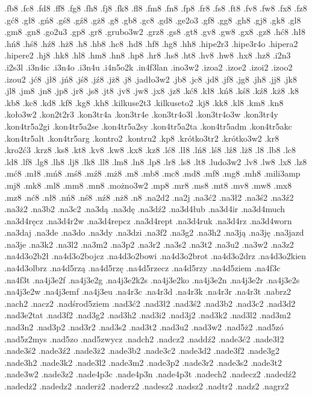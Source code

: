{.fb8
.fc8
.fd8
.ff8
.fg8
.fh8
.fj8
.fk8
.fl8
.fm8
.fn8
.fp8
.fr8
.fs8
.ft8
.fv8
.fw8
.fx8
.fz8
.gć8
.gł8
.gń8
.gś8
.gź8
.gż8
.g8
.gb8
.gc8
.gd8
.ge2o3
.gf8
.gg8
.gh8
.gj8
.gk8
.gl8
.gm8
.gn8
.go2u3
.gp8
.gr8
.grubo3w2
.grz8
.gs8
.gt8
.gv8
.gw8
.gx8
.gz8
.hć8
.hł8
.hń8
.hś8
.hź8
.hż8
.h8
.hb8
.hc8
.hd8
.hf8
.hg8
.hh8
.hipe2r3
.hipe3r4o
.hipera2
.hipere2
.hj8
.hk8
.hl8
.hm8
.hn8
.hp8
.hr8
.hs8
.ht8
.hv8
.hw8
.hx8
.hz8
.i2n3
.i2s3l
.i3n4ic
.i3n4o
.i3n4u
.i4n5o2k
.in4f3lan
.ino3w2
.izoa2
.izoe2
.izoi2
.izoo2
.izou2
.jć8
.jł8
.jń8
.jś8
.jź8
.jż8
.j8
.jadło3w2
.jb8
.jc8
.jd8
.jf8
.jg8
.jh8
.jj8
.jk8
.jl8
.jm8
.jn8
.jp8
.jr8
.js8
.jt8
.jv8
.jw8
.jx8
.jz8
.kć8
.kł8
.kń8
.kś8
.kź8
.kż8
.k8
.kb8
.kc8
.kd8
.kf8
.kg8
.kh8
.kilkuse2t3
.kilkuseto2
.kj8
.kk8
.kl8
.km8
.kn8
.koło3w2
.kon2t2r3
.kon3tr4a
.kon3tr4e
.kon3tr4o3l
.kon3tr4o3w
.kon3tr4y
.kon4tr5a2gi
.kon4tr5a2se
.kon4tr5a2sy
.kon4tr5a2ta
.kon4tr5adm
.kon4tr5akc
.kon4tr5alt
.kon4tr5arg
.kontro2
.kontru2
.kp8
.krótko3tr2
.krótko3w2
.kr8
.kro2ć3
.krz8
.ks8
.kt8
.kv8
.kw8
.kx8
.kz8
.lć8
.lł8
.lń8
.lś8
.lź8
.lż8
.l8
.lb8
.lc8
.ld8
.lf8
.lg8
.lh8
.lj8
.lk8
.ll8
.lm8
.ln8
.lp8
.lr8
.ls8
.lt8
.ludo3w2
.lv8
.lw8
.lx8
.lz8
.mć8
.mł8
.mń8
.mś8
.mź8
.mż8
.m8
.mb8
.mc8
.md8
.mf8
.mg8
.mh8
.mili3amp
.mj8
.mk8
.ml8
.mm8
.mn8
.możno3w2
.mp8
.mr8
.ms8
.mt8
.mv8
.mw8
.mx8
.mz8
.nć8
.nł8
.nń8
.nś8
.nź8
.nż8
.n8
.na2d2
.na2j
.na3ć2
.na3ł2
.na3ś2
.na3ź2
.na3ż2
.na3b2
.na3c2
.na3dą
.na3dę
.na3dź2
.na3d4łub
.na3d4ir
.na3d4much
.na3d4ręcz
.na3d4r2w
.na3d4repcz
.na3d4rept
.na3d4ruk
.na3d4rz
.na3d4worn
.na3daj
.na3de
.na3do
.na3dy
.na3dzi
.na3f2
.na3g2
.na3h2
.na3ją
.na3ję
.na3jazd
.na3je
.na3k2
.na3l2
.na3m2
.na3p2
.na3r2
.na3s2
.na3t2
.na3u2
.na3w2
.na3z2
.na4d3o2b2ł
.na4d3o2bojcz
.na4d3o2bowi
.na4d3o2brot
.na4d3o2drz
.na4d3o2kien
.na4d3olbrz
.na4d5rzą
.na4d5rzę
.na4d5rzecz
.na4d5rzy
.na4d5ziem
.na4f3c
.na4f3t
.na4j3e2f
.na4j3e2g
.na4j3e2k2s
.na4j3e2ko
.na4j3e2n
.na4j3e2r
.na4j3e2s
.na4j3e2w
.na4j3emf
.na4j3eu
.na4r3c
.na4r3d
.na4r3k
.na4r3r
.na4r3t
.nabrz2
.nach2
.nacz2
.nadśrod5ziem
.nad3ć2
.nad3ł2
.nad3ś2
.nad3b2
.nad3c2
.nad3d2
.nad3e2tat
.nad3f2
.nad3g2
.nad3h2
.nad3i2
.nad3j2
.nad3k2
.nad3l2
.nad3m2
.nad3n2
.nad3p2
.nad3r2
.nad3s2
.nad3t2
.nad3u2
.nad3w2
.nad5ż2
.nad5zó
.nad5z2mys
.nad5zo
.nad5zwycz
.nadch2
.nadcz2
.naddź2
.nade3ć2
.nade3ł2
.nade3ś2
.nade3ź2
.nade3ż2
.nade3b2
.nade3c2
.nade3d2
.nade3f2
.nade3g2
.nade3h2
.nade3k2
.nade3l2
.nade3m2
.nade3p2
.nade3r2
.nade3s2
.nade3t2
.nade3w2
.nade3z2
.nade4p3c
.nade4p3n
.nade4p3t
.nadech2
.nadecz2
.nadedź2
.nadedż2
.nadedz2
.naderż2
.naderz2
.nadesz2
.nadsz2
.nadtr2
.nadz2
.nagrz2
}
